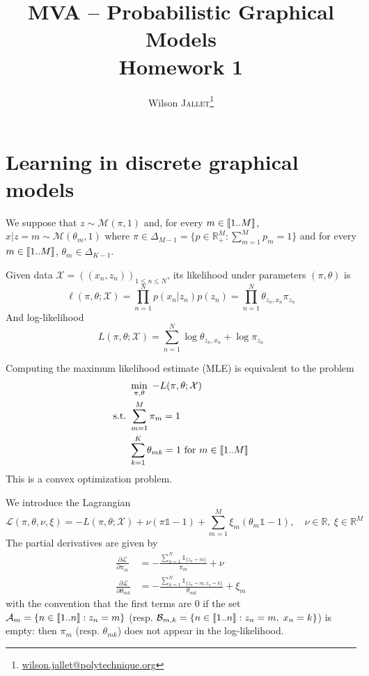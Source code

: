 \documentclass[11pt]{article}
\title{
	MVA -- Probabilistic Graphical Models\\
	{\color{NavyBlue}\sffamily Homework 1}
}
\author{
	Wilson \textsc{Jallet}\thanks{\url{wilson.jallet@polytechnique.org}}}
\newcommand\RR{\mathbb{R}}
\DeclarePairedDelimiter{\intinterv}{\llbracket}{\rrbracket}
\newcommand{\suchthat}{\mathrm{s.t.}}
\newcommand{\calM}{\mathcal{M}}
\newcommand{\calX}{\mathcal{X}}
\newcommand{\calL}{\mathcal{L}}
\begin{document}
\maketitle

\section{Learning in discrete graphical models}


We suppose that $z \sim \calM(\pi, 1)$ and, for every $m\in\intinterv{1..M}$, $x | z=m \sim \calM(\theta_m, 1)$ where $\pi \in \Delta_{M-1} = \{ p \in\RR_+^M : \sum_{m=1}^{M} p_m = 1 \}$ and for every $m \in \intinterv{1..M}$, $\theta_m \in \Delta_{K-1}$.

Given data $\calX = {((x_n, z_n))}_{1\leq n\leq N}$, its likelihood under parameters $(\pi, \theta)$ is
\begin{equation}
\ell(\pi, \theta; \calX) = 
\prod_{n=1}^N p(x_n|z_n) p(z_n) =
\prod_{n=1}^N \theta_{z_n,x_n} \pi_{z_n}
\end{equation}
And log-likelihood
\begin{equation}
L(\pi, \theta; \calX) =
\sum_{n=1}^N \log\theta_{z_n,x_n} + \log \pi_{z_n}
\end{equation}

Computing the maximum likelihood estimate (MLE) is equivalent to the problem
\begin{equation}
\begin{aligned}
&\min_{\pi,\theta}~ -L(\pi,\theta;\calX) \\
\suchthat \ &\sum_{m=1}^M \pi_m = 1 \\
			&\sum_{k=1}^K \theta_{mk} = 1\ \text{for } m\in\intinterv{1..M}
\end{aligned}
\end{equation}
This is a convex optimization problem.

We introduce the Lagrangian
\[
	\calL(\pi, \theta, \nu, \xi) =
	-L(\pi,\theta;\calX) + \nu (\pi\mathds{1} - 1) + \sum_{m=1}^M \xi_m (\theta_m\mathds{1}-1), \quad
	\nu \in \RR, \ \xi\in\RR^M
\]
The partial derivatives are given by
\begin{align*}
	\frac{\partial\calL}{\partial \pi_m} &=
	-\frac{
		\sum_{n=1}^N \mathds{1}_{\{z_n=m\}}
	}{\pi_m}
	+ \nu \\
	\frac{\partial\calL}{\partial \theta_{mk}} &=
	-\frac{
		\sum_{n=1}^N \mathds{1}_{\{z_n=m,x_n=k\}}
	}{\theta_{mk}}
	+ \xi_m
\end{align*}
with the convention that the first terms are $0$ if the set $\mathcal{A}_m = \{n\in\intinterv{1..n}: z_n = m\}$ (resp. $\mathcal{B}_{m,k} = \{n\in\intinterv{1..n}: z_n=m,\; x_n=k\}$) is empty: then $\pi_m$ (resp. $\theta_{mk}$) does not appear in the log-likelihood.
\end{document}
